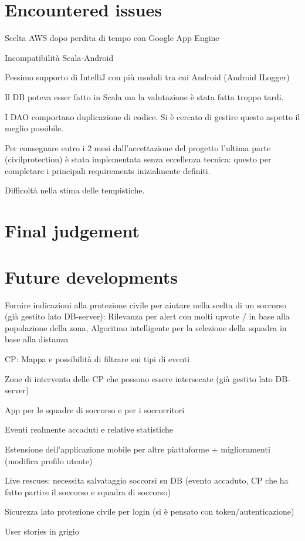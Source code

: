 \documentclass[a4paper,12pt]{report}
\begin{document}
\section{Encountered issues}
Scelta AWS dopo perdita di tempo con Google App Engine

Incompatibilità Scala-Android

Pessimo supporto di IntelliJ con più moduli tra cui Android (Android ILogger)

Il DB poteva esser fatto in Scala ma la valutazione è stata fatta troppo tardi.

I DAO comportano duplicazione di codice. Si è cercato di gestire questo aspetto il meglio possibile.

Per consegnare entro i 2 mesi dall'accettazione del progetto l'ultima parte (civilprotection) è stata implementata senza eccellenza tecnica: questo per completare i principali requirements inizialmente definiti.

Difficoltà nella stima delle tempistiche.

\section{Final judgement}

\section{Future developments}
Fornire indicazioni alla protezione civile per aiutare nella scelta di un soccorso (già gestito lato DB-server): Rilevanza per alert con molti upvote / in base alla popolazione della zona, Algoritmo intelligente per la selezione della squadra in base alla distanza

CP: Mappa e possibilità di filtrare sui tipi di eventi

Zone di intervento delle CP che possono essere intersecate (già gestito lato DB-server)

App per le squadre di soccorso e per i soccorritori

Eventi realmente accaduti e relative statistiche

Estensione dell'applicazione mobile per altre piattaforme + miglioramenti (modifica profilo utente)

Live rescues: necessita salvataggio soccorsi su DB (evento accaduto, CP che ha fatto partire il soccorso e squadra di soccorso)

Sicurezza lato protezione civile per login (si è pensato con token/autenticazione)

User stories in grigio
\end{document}
